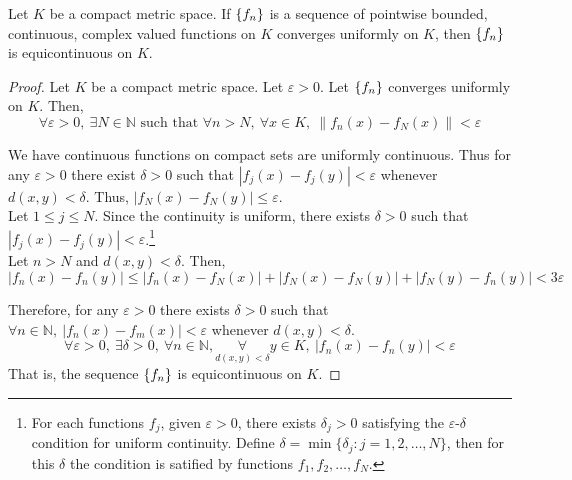 \begin{theorem}
	Let $K$ be a compact metric space.
	If $\left\{f_n\right\}$ is a sequence of pointwise bounded, continuous, complex valued functions on $K$ converges uniformly on $K$, then $\left\{f_n\right\}$ is equicontinuous on $K$.
\end{theorem}
\begin{proof}
	Let $K$ be a compact metric space.
	Let $\varepsilon > 0$.
	Let $\left\{f_n\right\}$ converges uniformly on $K$.
	Then,
	\[ \forall \varepsilon > 0,\ \exists N \in \mathbb{N} \text{ such that } \forall n > N,\ \forall x \in K,\ \| f_n(x)-f_N(x) \| < \varepsilon \]

	We have continuous functions on compact sets are uniformly continuous.
	Thus for any $\varepsilon > 0$ there exist $\delta > 0$ such that $|f_j(x) - f_j(y)| < \varepsilon$ whenever $d(x,y) < \delta$.
	Thus, $|f_N(x) - f_N(y)| \le \varepsilon$.\\

	Let $1 \le j \le N$.
	Since the continuity is uniform, there exists $\delta > 0$ such that $|f_j(x) - f_j(y)| < \varepsilon$.\dag\footnote{
		For each functions $f_j$, given $\varepsilon > 0$, there exists $\delta_j > 0$ satisfying the $\varepsilon$-$\delta$ condition for uniform continuity.
		Define $\delta = \min \{ \delta_j : j = 1,2,\dots,N \}$, then for this $\delta$ the condition is satified by functions $f_1,f_2,\dots,f_N$.}\\

	Let $n > N$ and $d(x,y) < \delta$.
	Then,
	\[ |f_n(x)-f_n(y)| \le |f_n(x)-f_N(x)| + |f_N(x) - f_N(y)| + |f_N(y) - f_n(y)| < 3\varepsilon \]

	Therefore, for any $\varepsilon > 0$ there exists $\delta > 0$ such that $\forall n \in \mathbb{N},\ |f_n(x) - f_m(x)| < \varepsilon$ whenever $d(x,y)< \delta$.
	\[ \forall \varepsilon > 0,\ \exists \delta > 0,\ \forall n \in \mathbb{N},\!\! \underset{d(x,y) < \delta}{\forall} \!\!\!\! y \in K,\ |f_n(x)-f_n(y)| < \varepsilon \]
	That is, the sequence $\left\{f_n\right\}$ is equicontinuous on $K$.
\end{proof}

